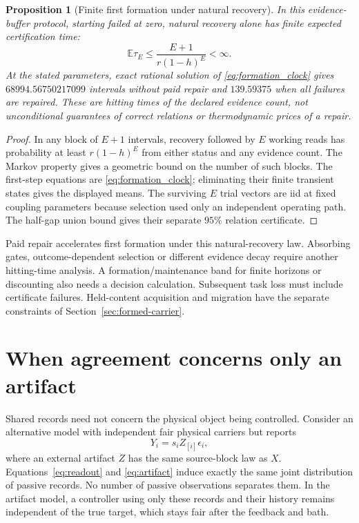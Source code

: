 \documentclass[11pt]{article}
\newtheorem{proposition}[theorem]{Proposition}
\theoremstyle{definition}
\theoremstyle{remark}
\newcommand{\E}{\mathbb E}
\begin{document}
\begin{proposition}[Finite first formation under natural recovery]
\label{prop:formation_clock}
In this evidence-buffer protocol, starting failed at zero,
natural recovery alone has finite expected certification time:
\[
 \E\tau_E\le\frac{E+1}{r(1-h)^E}<\infty .
\]
At the stated parameters, exact rational solution of
\eqref{eq:formation_clock} gives $68994.56750217099$ intervals
without paid repair and $139.59375$ when all failures are repaired.
These are hitting times of the declared evidence count, not
unconditional guarantees of correct relations or thermodynamic
prices of a repair.
\end{proposition}
\begin{proof}
In any block of $E+1$ intervals, recovery followed by $E$ working
reads has probability at least $r(1-h)^E$ from either status and
any evidence count. The Markov property gives a geometric bound
on the number of such blocks. The first-step equations are
\eqref{eq:formation_clock}; eliminating their finite transient
states gives the displayed means. The surviving $E$ trial vectors
are iid at fixed coupling parameters because selection used only
an independent operating path. The half-gap union bound gives
their separate $95\%$ relation certificate.
\end{proof}

Paid repair accelerates first formation under this natural-recovery law. Absorbing gates, outcome-dependent selection or different evidence decay require another hitting-time analysis. A formation/maintenance band for finite horizons or discounting also needs a decision calculation. Subsequent task loss must include certificate failures. Held-content acquisition and migration have the separate constraints of Section~\ref{sec:formed-carrier}.

\section{When agreement concerns only an artifact}
\label{sec:artifact}

Shared records need not concern the physical object being controlled. Consider an alternative model with independent fair physical carriers but reports
\begin{equation}
 Y_i=s_iZ_{[i]}\epsilon_i,
 \label{eq:artifact}
\end{equation}
where an external artifact $Z$ has the same source-block law as $X$. Equations~\eqref{eq:readout} and \eqref{eq:artifact} induce exactly the same joint distribution of passive records. No number of passive observations separates them. In the artifact model, a controller using only these records and their history remains independent of the true target, which stays fair after the feedback and bath.
\end{document}
